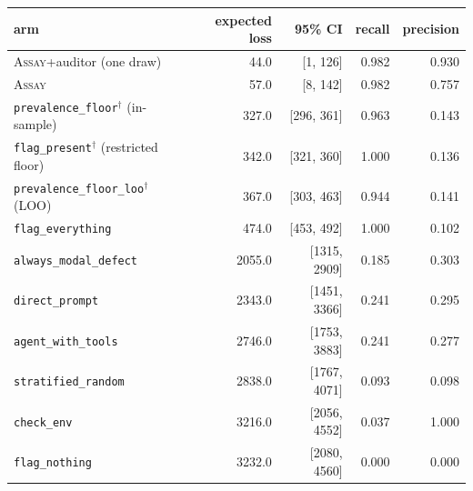 \begin{tabular}{@{}lrrrr@{}}
\toprule
arm & expected loss & 95\% CI & recall & precision \\
\midrule
\textsc{Assay}+auditor (one draw) & 44.0 & [1, 126] & 0.982 & 0.930 \\
\textsc{Assay} & 57.0 & [8, 142] & 0.982 & 0.757 \\
\midrule
\texttt{prevalence\_floor}$^\dagger$ (in-sample) & 327.0 & [296, 361] & 0.963 & 0.143 \\
\texttt{flag\_present}$^\dagger$ (restricted floor) & 342.0 & [321, 360] & 1.000 & 0.136 \\
\texttt{prevalence\_floor\_loo}$^\dagger$ (LOO) & 367.0 & [303, 463] & 0.944 & 0.141 \\
\texttt{flag\_everything} & 474.0 & [453, 492] & 1.000 & 0.102 \\
\texttt{always\_modal\_defect} & 2055.0 & [1315, 2909] & 0.185 & 0.303 \\
\texttt{direct\_prompt} & 2343.0 & [1451, 3366] & 0.241 & 0.295 \\
\texttt{agent\_with\_tools} & 2746.0 & [1753, 3883] & 0.241 & 0.277 \\
\texttt{stratified\_random} & 2838.0 & [1767, 4071] & 0.093 & 0.098 \\
\texttt{check\_env} & 3216.0 & [2056, 4552] & 0.037 & 1.000 \\
\texttt{flag\_nothing} & 3232.0 & [2080, 4560] & 0.000 & 0.000 \\
\bottomrule
\end{tabular}
